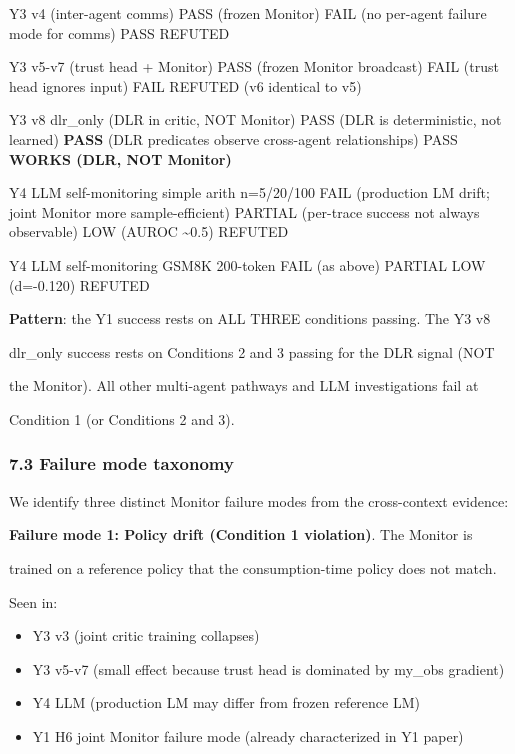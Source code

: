 \documentclass[11pt]{article}
\begin{document}
Y3 v4 (inter-agent comms) \textbar{} PASS (frozen Monitor) \textbar{}
FAIL (no per-agent failure mode for comms) \textbar{} PASS \textbar{}
REFUTED \textbar{}

Y3 v5-v7 (trust head + Monitor) \textbar{} PASS (frozen Monitor
broadcast) \textbar{} FAIL (trust head ignores input) \textbar{} FAIL
\textbar{} REFUTED (v6 identical to v5) \textbar{}

Y3 v8 dlr\_only (DLR in critic, NOT Monitor) \textbar{} PASS (DLR is
deterministic, not learned) \textbar{} \textbf{PASS} (DLR predicates
observe cross-agent relationships) \textbar{} PASS \textbar{}
\textbf{WORKS (DLR, NOT Monitor)} \textbar{}

Y4 LLM self-monitoring simple arith n=5/20/100 \textbar{} FAIL
(production LM drift; joint Monitor more sample-efficient) \textbar{}
PARTIAL (per-trace success not always observable) \textbar{} LOW (AUROC
\textasciitilde0.5) \textbar{} REFUTED \textbar{}

Y4 LLM self-monitoring GSM8K 200-token \textbar{} FAIL (as above)
\textbar{} PARTIAL \textbar{} LOW (d=-0.120) \textbar{} REFUTED
\textbar{}

\textbf{Pattern}: the Y1 success rests on ALL THREE conditions passing.
The Y3 v8

dlr\_only success rests on Conditions 2 and 3 passing for the DLR signal
(NOT

the Monitor). All other multi-agent pathways and LLM investigations fail
at

Condition 1 (or Conditions 2 and 3).

\subsubsection{7.3 Failure mode taxonomy}\label{failure-mode-taxonomy}

We identify three distinct Monitor failure modes from the cross-context
evidence:

\textbf{Failure mode 1: Policy drift (Condition 1 violation)}. The
Monitor is

trained on a reference policy that the consumption-time policy does not
match.

Seen in:

\begin{itemize}
\item
  Y3 v3 (joint critic training collapses)
\item
  Y3 v5-v7 (small effect because trust head is dominated by my\_obs
  gradient)
\item
  Y4 LLM (production LM may differ from frozen reference LM)
\item
  Y1 H6 joint Monitor failure mode (already characterized in Y1 paper)
\end{itemize}
\end{document}
